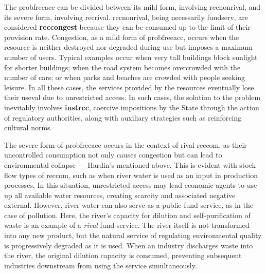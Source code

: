 \documentclass[./main_en.tex]{subfiles}
\begin{document}
\par The \gls{probfreeacc} can be divided between its mild form, involving \gls{recnonrival}, and its severe form, involving \gls{recrival}. \gls{recnonrival}, being necessarily \gls{fundserv}, are considered \textbf{\gls{reccongest}} because they can be consumed up to the limit of their provision rate. Congestion, as a mild form of \gls{probfreeacc}, occurs when the resource is neither destroyed nor degraded during use but imposes a maximum number of users. Typical examples occur when very tall buildings block sunlight for shorter buildings; when the road \gls{system} becomes overcrowded with the number of cars; or when parks and beaches are crowded with people seeking leisure. In all these cases, the services provided by the resources eventually lose their \gls{useval} due to unrestricted access. In such cases, the solution to the problem inevitably involves \textbf{\gls{instrcc}}, coercive impositions by the State through the action of regulatory authorities, along with auxiliary strategies such as reinforcing cultural norms.

\par The severe form of \gls{probfreeacc} occurs in the context of rival \gls{reccom}, as their uncontrolled consumption not only causes congestion but can lead to environmental collapse — Hardin's  mentioned above. This is evident with stock-flow types of \gls{reccom}, such as when river water is used as an input in production processes. In this situation, unrestricted access may lead economic agents to use up all available water resources, creating scarcity and associated negative \gls{external}. However, river water can also serve as a public fund-service, as in the case of pollution. Here, the river's capacity for dilution and self-purification of waste is an example of a \textit{rival} fund-service. The river itself is not transformed into any new product, but the natural service of regulating environmental quality is progressively degraded as it is used. When an industry discharges waste into the river, the original dilution capacity is consumed, preventing subsequent industries downstream from using the service simultaneously.
\end{document}
